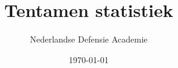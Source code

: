 \documentclass{article}
\begin{document}


\title{Tentamen statistiek}
\author{Nederlandse Defensie Academie}
\date{\today}
\maketitle






\end{document}
